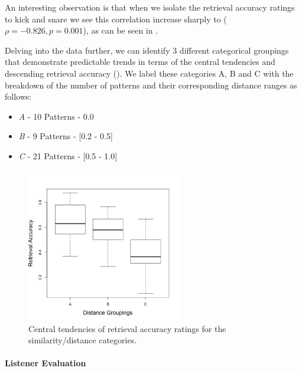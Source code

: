 An interesting observation is that when we isolate the retrieval accuracy ratings to kick and snare we see this correlation increase sharply to ($\rho = -0.826, p = 0.001$), as can be seen in .

Delving into the data further, we can identify 3 different categorical groupings that demonstrate predictable trends in terms of the central tendencies and descending retrieval accuracy (). We label these categories A, B and C with the breakdown of the number of patterns and their corresponding distance ranges as follows:

\begin{itemize}
  \item \textit{A} - 10 Patterns - 0.0
  \item \textit{B} - 9 Patterns - [0.2 - 0.5]
  \item \textit{C} - 21 Patterns - [0.5 - 1.0]
\end{itemize}

\begin{figure}
	\begin{center}
		\includegraphics[width=0.6\textwidth]{ch07_evaluation/figures/new_retrieval_plot.png}
	\end{center}
	\caption[Central tendencies of retrieval accuracy ratings for the similarity/distance categories
]{Central tendencies of retrieval accuracy ratings for the similarity/distance categories.}
	\label{fig:central_tendencies}
\end{figure}

\paragraph{Listener Evaluation}

